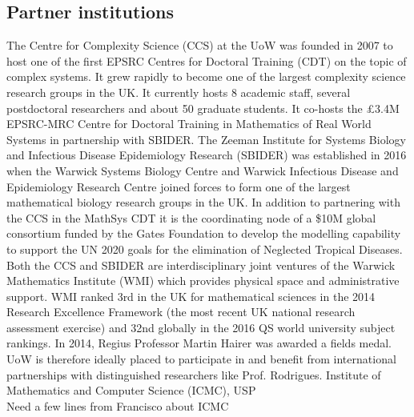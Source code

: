 \subsection{Partner institutions}
The {\hvnb Centre for Complexity Science (CCS)} at the UoW was founded in 2007 
to host one of the first EPSRC Centres for Doctoral Training (CDT) on the topic 
of complex systems. It grew rapidly to become one of the largest complexity 
science research groups in the UK. It currently hosts 8 academic staff, several 
postdoctoral researchers and about 50 graduate students. It co-hosts the 
\pounds 3.4M EPSRC-MRC Centre for Doctoral Training in Mathematics of Real 
World Systems in partnership with SBIDER. The {\hvnb Zeeman Institute for 
Systems Biology and Infectious Disease Epidemiology Research (SBIDER)} was 
established in 2016 when the Warwick Systems Biology Centre and Warwick 
Infectious Disease and Epidemiology Research Centre joined forces to form one 
of the largest mathematical biology research groups in the UK. In addition to 
partnering with the CCS in the MathSys CDT it is the coordinating node of a 
\$10M global consortium funded by the Gates Foundation to develop the modelling 
capability to support the UN 2020 goals for the elimination of Neglected 
Tropical Diseases. Both the CCS and SBIDER are interdisciplinary joint ventures 
of the {\hvnb Warwick Mathematics Institute (WMI)} which provides physical 
space and administrative support. WMI ranked 3rd in the UK for mathematical 
sciences in the 2014 Research Excellence Framework (the most recent UK national 
research assessment exercise) and 32nd globally in the 2016 QS world university 
subject rankings. In 2014, Regius Professor Martin Hairer was awarded a fields 
medal. UoW is therefore ideally placed to participate in and benefit from 
international partnerships with distinguished researchers like Prof. Rodrigues. 
{\hvnb  Institute of Mathematics and Computer Science (ICMC), USP}\\
{\color{red} Need a few lines from Francisco about ICMC}

